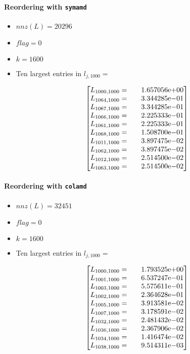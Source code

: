 \begin{enumerate}
\paragraph*{Reordering with \texttt{symamd}}
\begin{itemize}
\item $nnz(L)= 20296$
\item $flag= 0$
\item $k= 1600$
\item Ten largest entries in $l_{j,1000}= $

$$
\begin{bmatrix}
L_{1000,1000}=  & \quad {1.657056}\mathrm{e}{+00}\\
L_{1064,1000}=  & \quad {3.344285}\mathrm{e}{-01}\\
L_{1067,1000}=  & \quad {3.344285}\mathrm{e}{-01}\\
L_{1066,1000}=  & \quad {2.225333}\mathrm{e}{-01}\\
L_{1061,1000}=  & \quad {2.225333}\mathrm{e}{-01}\\
L_{1068,1000}=  & \quad {1.508700}\mathrm{e}{-01}\\
L_{1011,1000}=  & \quad {3.897475}\mathrm{e}{-02}\\
L_{1062,1000}=  & \quad {3.897475}\mathrm{e}{-02}\\
L_{1012,1000}=  & \quad {2.514500}\mathrm{e}{-02}\\
L_{1063,1000}=  & \quad {2.514500}\mathrm{e}{-02}\\
\end{bmatrix}
$$
\end{itemize}
\newpage
\paragraph*{Reordering with \texttt{colamd}}
\begin{itemize}
\item $nnz(L)= 32451$
\item $flag= 0$
\item $k= 1600$
\item Ten largest entries in $l_{j,1000}= $

$$
\begin{bmatrix}
L_{1000,1000}=  & \quad {1.793525}\mathrm{e}{+00}\\
L_{1001,1000}=  & \quad {6.537247}\mathrm{e}{-01}\\
L_{1003,1000}=  & \quad {5.575611}\mathrm{e}{-01}\\
L_{1002,1000}=  & \quad {2.364628}\mathrm{e}{-01}\\
L_{1005,1000}=  & \quad {3.913581}\mathrm{e}{-02}\\
L_{1007,1000}=  & \quad {3.178591}\mathrm{e}{-02}\\
L_{1032,1000}=  & \quad {2.481432}\mathrm{e}{-02}\\
L_{1036,1000}=  & \quad {2.367906}\mathrm{e}{-02}\\
L_{1034,1000}=  & \quad {1.416474}\mathrm{e}{-02}\\
L_{1038,1000}=  & \quad {9.514311}\mathrm{e}{-03}\\
\end{bmatrix}
$$
\end{itemize}

\end{enumerate}
